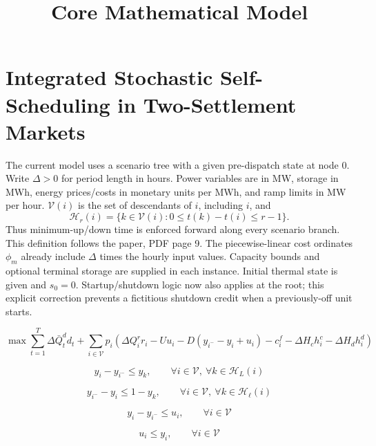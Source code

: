 \documentclass{article}
\title{Core Mathematical Model}
\date{}
\begin{document}
\maketitle

\section*{Integrated Stochastic Self-Scheduling in Two-Settlement Markets}


The current model uses a scenario tree with a given pre-dispatch state at node 0.
Write $\Delta>0$ for period length in hours. Power variables are in MW, storage in MWh,
energy prices/costs in monetary units per MWh, and ramp limits in MW per hour.
$\mathcal V(i)$ is the set of descendants of $i$, including $i$, and
\[
\mathcal H_r(i)=\{k\in\mathcal V(i):0\le t(k)-t(i)\le r-1\}.
\]
Thus minimum-up/down time is enforced forward along every scenario branch.
This definition follows the paper, PDF page 9. 
The piecewise-linear cost ordinates $\phi_m$ already include $\Delta$ times the
hourly input values. Capacity bounds and optional terminal storage are supplied in each instance.
Initial thermal state is given and $s_0=0$. Startup/shutdown logic now also applies at the root;
this explicit correction prevents a fictitious shutdown credit when a previously-off unit starts.


\begin{equation}
\max
\sum_{t=1}^T \Delta\bar{Q}_t^d d_t
+ \sum_{i \in \mathcal{V}} p_i
\left(
\Delta Q_i^r r_i
- Uu_i
- D(y_{i^-} - y_i + u_i)
- c_i^f
- \Delta H_c h_i^c
- \Delta H_d h_i^d
\right)
\tag{TMS-DE}
\end{equation}

\begin{equation}
y_i - y_{i^-} \le y_k,
\qquad
\forall i \in \mathcal{V},\ \forall k \in \mathcal{H}_L(i)
\tag{1a}
\end{equation}

\begin{equation}
y_{i^-} - y_i \le 1 - y_k,
\qquad
\forall i \in \mathcal{V},\ \forall k \in \mathcal{H}_{\ell}(i)
\tag{1b}
\end{equation}

\begin{equation}
y_i - y_{i^-} \le u_i,
\qquad
\forall i \in \mathcal{V}
\tag{1c}
\end{equation}

\begin{equation}
u_i \le y_i,
\qquad
\forall i \in \mathcal{V}
\tag{1d-1}
\end{equation}
\end{document}
